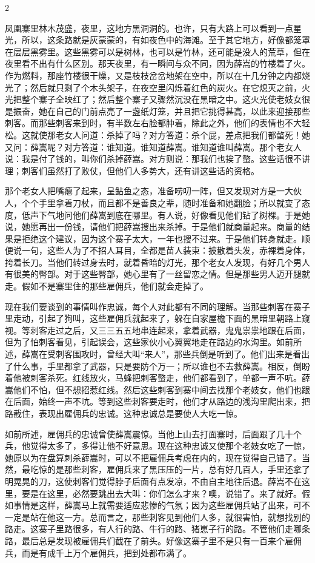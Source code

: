 2 

凤凰寨里林木茂盛，夜里，这地方黑洞洞的。也许，只有大路上可以看到一点星光，所以，这条路就是灰蒙蒙的，有如夜色中的海滩。至于其它地方，好像都笼罩在层层黑雾里。这些黑雾可以是树林，也可以是竹林，还可能是没人的荒草，但在夜里看不出有什么区别。那天夜里，有一瞬间与众不同，因为薛嵩的竹楼着了火。作为燃料，那座竹楼很干燥，又是枝枝岔岔地架在空中，所以在十几分钟之内都烧光了；然后就只剩了个木头架子，在夜空里闪烁着红色的炭火。在它熄灭之前，火光把整个寨子全映红了；然后整个寨子又骤然沉没在黑暗之中。这火光使老妓女很是振奋，她在自己的门前点亮了一盏纸灯笼，并且把它挑得甚高，以此来迎接那些刺客。而那些刺客来到时，有半数左右脸都肿着，除此之外，他们的表情也不大轻松。这就使那老女人问道：杀掉了吗？对方答道：杀个屁，差点把我们都螫死！她又问：薛嵩呢？对方答道：谁知道。谁知道薛嵩。谁知道谁叫薛嵩。那个老女人说：我是付了钱的，叫你们杀掉薛嵩。对方则说：那我们也挨了螫。这些话很不讲理；刺客们虽然打了败仗，但他们人多势大，还有讲这些话的资格。 

那个老女人把嘴瘪了起来，呈鲇鱼之态，准备唠叨一阵，但又发现对方是一大伙人，个个手里拿着刀杖，而且都不是善良之辈，随时准备和她翻脸；所以就变了态度，低声下气地问他们薛嵩到底在哪里。有人说，好像看见他们钻了树棵。于是她说，她愿再出一份钱，请他们把薛嵩搜出来杀掉。于是他们就商量起来。商量的结果是拒绝这个建议，因为这个寨子太大，一年也搜不过来。于是他们转身就走。顺便说一句，这些人为了不招人耳目，全都是苗人装束：披散着头发，赤裸着身体，挎着长刀。当他们转过身去时，就着昏暗的灯光，那个老女人发现，有好几个男人有很美的臀部。对于这些臀部，她心里有了一丝留恋之情。但是那些男人迈开腿就走。假如不是寨里住的那些雇佣兵，他们就会走掉了。 

现在我们要谈到的事情叫作忠诚，每个人对此都有不同的理解。当那些刺客在寨子里走动，引起了狗叫，这些雇佣兵就起来了，躲在自家屋檐下面的黑暗里朝路上窥视。等刺客走过之后，又三三五五地串连起来，拿着武器，鬼鬼祟祟地跟在后面，但为了怕刺客看见，引起误会，这些家伙小心翼翼地走在路边的水沟里。如前所述，薛嵩在受刺客围攻时，曾经大叫“来人”，那些兵倒是听到了。他们出来是看出了什么事，手里都拿了武器，只是要防个万一；所以谁也不去救薛嵩。相反，倒盼着他被刺客杀死。红线放火，马蜂把刺客螫走，他们都看到了，单都一声不吭。薛嵩他们不怕，但不想招惹红线。然后这些刺客到寨中间去找那个老妓女，他们也跟在后面，始终一声不吭。等到这些刺客要走时，他们才从路边的浅沟里爬出来，把路截住，表现出雇佣兵的忠诚。这种忠诚总是要使人大吃一惊。 

如前所述，雇佣兵的忠诚曾使薛嵩震惊。当他上山去打面寨时，后面跟了几十个兵，他觉得太多了，多得让他不好意思。现在这种忠诚又使那个老妓女吃了一惊，她原以为在盘算刺杀薛嵩时，可以不把雇佣兵考虑在内的，现在觉得自己错了。当然，最吃惊的是那些刺客，雇佣兵来了黑压压的一片，总有好几百人，手里还拿了明晃晃的刀，这使刺客们觉得脖子后面有点发凉，不由自主地往后退。薛嵩不在这里，要是在这里，必然要跳出去大叫：你们怎么才来？噢，说错了。来了就好。假如事情是这样，薛嵩马上就需要适应悲惨的气氛；因为这些雇佣兵站了出来，可不一定是站在他这一方。总而言之，那些刺客见到他们人多，就很害怕，就想找别的路走。这寨子里路很多，有人行的路、牛行的路、猪崽子行的路。不管他们走哪条路，最后总是发现被雇佣兵们截在了前头。好像这寨子里不是只有一百来个雇佣兵，而是有成千上万个雇佣兵，把到处都布满了。 

